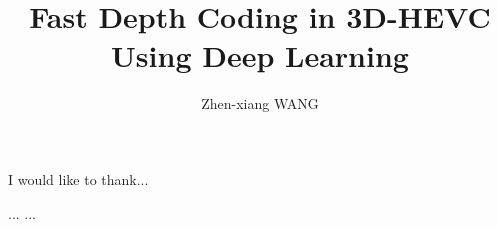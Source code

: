 \documentclass{report}
\begin{document}
    \title{Fast Depth Coding in 3D-HEVC\\
    Using Deep Learning}
    \author{Zhen-xiang WANG}
    \beforepreface

    I would like to thank...
    \afterpreface

    
    
    ...
    ...
    \printbibliography[heading=bibintoc]
\end{document}
